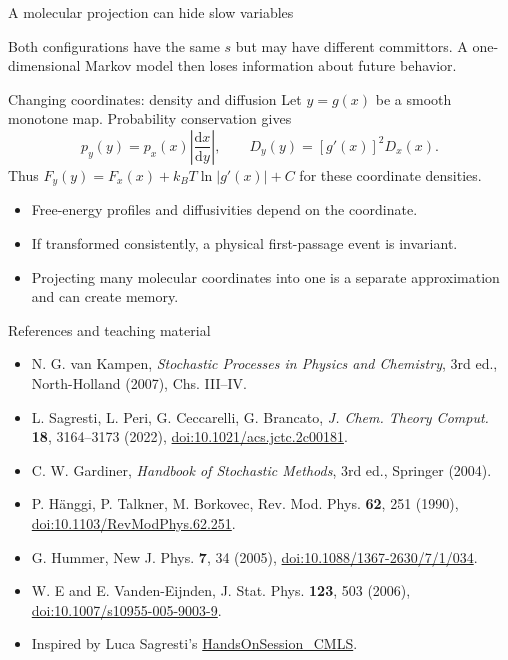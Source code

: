 \documentclass[aspectratio=169,10pt]{beamer}
\newcommand{\dd}{\mathrm{d}}
\begin{document}
\begin{frame}{A molecular projection can hide slow variables}
\begin{center}
\end{center}
\small Both configurations have the same $s$ but may have different committors. A one-dimensional Markov model then loses information about future behavior.
\end{frame}

\begin{frame}{Changing coordinates: density and diffusion}
Let $y=g(x)$ be a smooth monotone map. Probability conservation gives
\[p_y(y)=p_x(x)\left|\frac{\dd x}{\dd y}\right|,\qquad
D_y(y)=[g'(x)]^2D_x(x).\]
Thus $F_y(y)=F_x(x)+k_BT\ln|g'(x)|+C$ for these coordinate densities.
\begin{itemize}
\item Free-energy profiles and diffusivities depend on the coordinate.
\item If transformed consistently, a physical first-passage event is invariant.
\item Projecting many molecular coordinates into one is a separate approximation and can create memory.
\end{itemize}
\end{frame}

\begin{frame}{References and teaching material}
\footnotesize
\begin{itemize}
\item N. G. van Kampen, \emph{Stochastic Processes in Physics and Chemistry}, 3rd ed., North-Holland (2007), Chs. III--IV.
\item L. Sagresti, L. Peri, G. Ceccarelli, G. Brancato, \emph{J. Chem. Theory Comput.} \textbf{18}, 3164--3173 (2022), \href{https://doi.org/10.1021/acs.jctc.2c00181}{doi:10.1021/acs.jctc.2c00181}.
\item C. W. Gardiner, \emph{Handbook of Stochastic Methods}, 3rd ed., Springer (2004).
\item P. H\"anggi, P. Talkner, M. Borkovec, Rev. Mod. Phys. \textbf{62}, 251 (1990), \href{https://doi.org/10.1103/RevModPhys.62.251}{doi:10.1103/RevModPhys.62.251}.
\item G. Hummer, New J. Phys. \textbf{7}, 34 (2005), \href{https://doi.org/10.1088/1367-2630/7/1/034}{doi:10.1088/1367-2630/7/1/034}.
\item W. E and E. Vanden-Eijnden, J. Stat. Phys. \textbf{123}, 503 (2006), \href{https://doi.org/10.1007/s10955-005-9003-9}{doi:10.1007/s10955-005-9003-9}.
\item Inspired by Luca Sagresti's \href{https://github.com/lianctrl/HandsOnSession_CMLS}{HandsOnSession\_CMLS}.
\end{itemize}
\end{frame}
\end{document}
